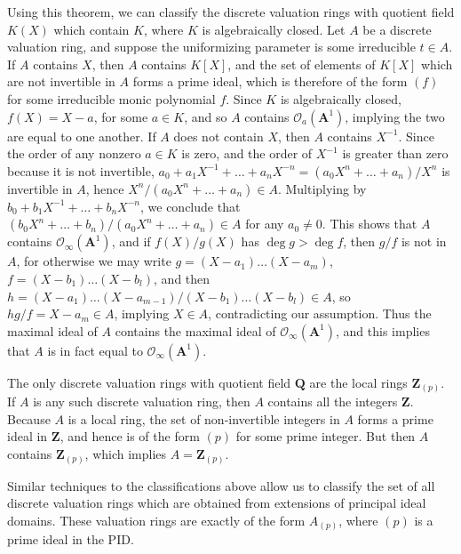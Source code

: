 \begin{example}
    Using this theorem, we can classify the discrete valuation rings with quotient field $K(X)$ which contain $K$, where $K$ is algebraically closed. Let $A$ be a discrete valuation ring, and suppose the uniformizing parameter is some irreducible $t \in A$. If $A$ contains $X$, then $A$ contains $K[X]$, and the set of elements of $K[X]$ which are not invertible in $A$ forms a prime ideal, which is therefore of the form $(f)$ for some irreducible monic polynomial $f$. Since $K$ is algebraically closed, $f(X) = X - a$, for some $a \in K$, and so $A$ contains $\mathcal{O}_a(\mathbf{A}^1)$, implying the two are equal to one another. If $A$ does not contain $X$, then $A$ contains $X^{-1}$. Since the order of any nonzero $a \in K$ is zero, and the order of $X^{-1}$ is greater than zero because it is not invertible, $a_0 + a_1X^{-1} + \dots + a_nX^{-n} = (a_0X^n + \dots + a_n)/X^n$ is invertible in $A$, hence $X^n/(a_0X^n + \dots + a_n) \in A$. Multiplying by $b_0 + b_1X^{-1} + \dots + b_nX^{-n}$, we conclude that $(b_0X^n + \dots + b_n)/(a_0X^n + \dots + a_n) \in A$ for any $a_0 \neq 0$. This shows that $A$ contains $\mathcal{O}_\infty(\mathbf{A}^1)$, and if $f(X)/g(X)$ has $\deg g > \deg f$, then $g/f$ is not in $A$, for otherwise we may write $g = (X-a_1) \dots (X-a_m)$, $f = (X-b_1) \dots (X - b_l)$, and then $h = (X-a_1) \dots (X-a_{m-1})/(X-b_1) \dots (X-b_l) \in A$, so $hg/f = X - a_m \in A$, implying $X \in A$, contradicting our assumption. Thus the maximal ideal of $A$ contains the maximal ideal of $\mathcal{O}_\infty(\mathbf{A}^1)$, and this implies that $A$ is in fact equal to $\mathcal{O}_\infty(\mathbf{A}^1)$.
\end{example}

\begin{example}
    The only discrete valuation rings with quotient field $\mathbf{Q}$ are the local rings $\mathbf{Z}_{(p)}$. If $A$ is any such discrete valuation ring, then $A$ contains all the integers $\mathbf{Z}$. Because $A$ is a local ring, the set of non-invertible integers in $A$ forms a prime ideal in $\mathbf{Z}$, and hence is of the form $(p)$ for some prime integer. But then $A$ contains $\mathbf{Z}_{(p)}$, which implies $A = \mathbf{Z}_{(p)}$.
\end{example}

Similar techniques to the classifications above allow us to classify the set of all discrete valuation rings which are obtained from extensions of principal ideal domains. These valuation rings are exactly of the form $A_{(p)}$, where $(p)$ is a prime ideal in the PID.
 
